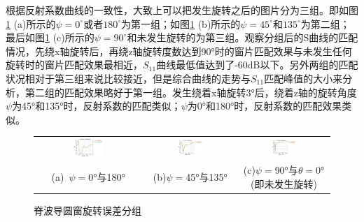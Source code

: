\documentclass[master]{thesis-uestc}
\begin{document}
根据反射系数曲线的一致性，大致上可以把发生旋转之后的图片分为三组。即如图\ref{fig:脊波导圆窗旋转分组} (a)所示的$\psi = 0 ^\circ$或者$180 ^\circ$为第一组；如图\ref{fig:脊波导圆窗旋转分组} (b)所示的$\psi = 45 ^\circ$和$135 ^\circ$为第二组；最后如图\ref{fig:脊波导圆窗旋转分组} (c)所示的$\psi = 90 ^\circ$和未发生旋转的为第三组。观察分组后的S曲线的匹配情况，先绕x轴旋转后，再绕z轴旋转度数达到90°时的窗片匹配效果与未发生任何旋转时的窗片匹配效果最相近，\(S_{11}\)曲线最低值达到了-60dB以下。另外两组的匹配状况相对于第三组来说比较接近，但是综合曲线的走势与\(S_{11}\)匹配峰值的大小来分析，第二组的匹配效果略好于第一组。发生绕着x轴旋转3°后，绕着z轴的旋转角度\(\psi\)为45°和135°时，反射系数的匹配类似；\(\psi\)为0°和180°时，反射系数的匹配效果类似。
\begin{figure}[!htb]
    \small
    \centering
    \begin{tabular}{@{\ }c@{\ }c@{\ }c}
        \includegraphics[width=0.3\textwidth]{pic/chapter5/分组-0-180.png} & 
        \hspace{5pt}
        \includegraphics[width=0.3\textwidth]{pic/chapter5/分组-45-135.png}&
        \hspace{5pt}
        \includegraphics[width=0.3\textwidth]{pic/chapter5/分组-90.png}      \\
        \mbox{\small (a) \(\psi=\)0°与180°}                                                                               & 
        \mbox{\small (b)\(\psi=\)45°与135°} & 
        \mbox{\small (c)\(\psi=\)90°与\(\theta=\)0°(即未发生旋转)}                                                                                  \\
    \end{tabular}
    \caption{脊波导圆窗旋转误差分组}
    \label{fig:脊波导圆窗旋转分组}
\end{figure}
\end{document}
